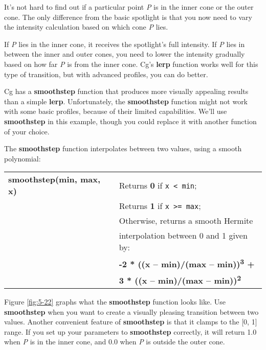 \documentclass[../main.tex]{subfiles}
\begin{document}
It's not hard to find out if a particular point \textit{P} is in the inner cone or the outer cone. The only difference from the basic spotlight is that you now need to vary the intensity calculation based on which cone \textit{P} lies.

If \textit{P} lies in the inner cone, it receives the spotlight's full intensity. If \textit{P} lies in between the inner and outer cones, you need to lower the intensity gradually based on how far \textit{P} is from the inner cone. Cg's \textbf{lerp} function works well for this type of transition, but with advanced profiles, you can do better.

Cg has a \textbf{smoothstep} function that produces more visually appealing results than a simple \textbf{lerp}. Unfortunately, the \textbf{smoothstep} function might not work with some basic profiles, because of their limited capabilities. We'll use \textbf{smoothstep} in this example, though you could replace it with another function of your choice.

The \textbf{smoothstep} function interpolates between two values, using a smooth polynomial:

\FloatBarrier
\begin{table}
\centering
\begin{tabular}{ p{5cm} p{7cm}  } 
\hline

\textbf{smoothstep(min, max, x)} & Returns \textbf{0} if \verb!x < min!; \\
& Returns \textbf{1} if \verb!x >= max!; \\
& Otherwise, returns a smooth Hermite \\
& interpolation between 0 and 1 given by: \\
& \textbf{-2 * ((x – min)/(max – min))\textsuperscript{3} +} \\
& \textbf{3 * ((x – min)/(max – min))\textsuperscript{2}} \\
\hline
\end{tabular}
\end{table}
\FloatBarrier

Figure \ref{fig:5-22} graphs what the \textbf{smoothstep} function looks like. Use \textbf{smoothstep} when you want to create a visually pleasing transition between two values. Another convenient feature of \textbf{smoothstep} is that it clamps to the [0, 1] range. If you set up your parameters to \textbf{smoothstep} correctly, it will return 1.0 when \textit{P} is in the inner cone, and 0.0 when \textit{P} is outside the outer cone.
\end{document}
